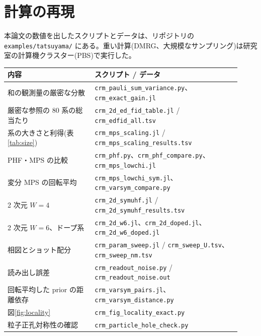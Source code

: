 \chapter{計算の再現}
\label{app:repro}

本論文の数値を出したスクリプトとデータは、リポジトリの \texttt{examples/tatsuyama/} にある。重い計算(DMRG、大規模なサンプリング)は研究室の計算機クラスター(PBS)で実行した。

\begin{center}\small
\begin{tabular}{@{}p{0.34\linewidth}p{0.58\linewidth}@{}}
\toprule
内容 & スクリプト / データ \\
\midrule
和の観測量の厳密な分散 & \texttt{crm\_pauli\_sum\_variance.py}、\texttt{crm\_exact\_gain.jl} \\
厳密な参照の 80 系の総当たり & \texttt{crm\_2d\_ed\_fid\_table.jl} / \texttt{crm\_edfid\_all.tsv} \\
系の大きさと利得(表\ref{tab:size}) & \texttt{crm\_mps\_scaling.jl} / \texttt{crm\_mps\_scaling\_results.tsv} \\
PHF・MPS の比較 & \texttt{crm\_phf.py}、\texttt{crm\_phf\_compare.py}、\texttt{crm\_mps\_lowchi.jl} \\
変分 MPS の回転平均 & \texttt{crm\_mps\_lowchi\_sym.jl}、\texttt{crm\_varsym\_compare.py} \\
2 次元 $W=4$ & \texttt{crm\_2d\_symuhf.jl} / \texttt{crm\_2d\_symuhf\_results.tsv} \\
2 次元 $W=6$、ドープ系 & \texttt{crm\_2d\_w6.jl}、\texttt{crm\_2d\_doped.jl}、\texttt{crm\_2d\_w6\_doped.jl} \\
相図とショット配分 & \texttt{crm\_param\_sweep.jl} / \texttt{crm\_sweep\_U.tsv}、\texttt{crm\_sweep\_nm.tsv} \\
読み出し誤差 & \texttt{crm\_readout\_noise.py} / \texttt{crm\_readout\_noise.out} \\
回転平均した prior の距離依存 & \texttt{crm\_varsym\_pairs.jl}、\texttt{crm\_varsym\_distance.py} \\
図\ref{fig:locality} & \texttt{crm\_fig\_locality\_exact.py} \\
粒子正孔対称性の確認 & \texttt{crm\_particle\_hole\_check.py} \\
\bottomrule
\end{tabular}
\end{center}

